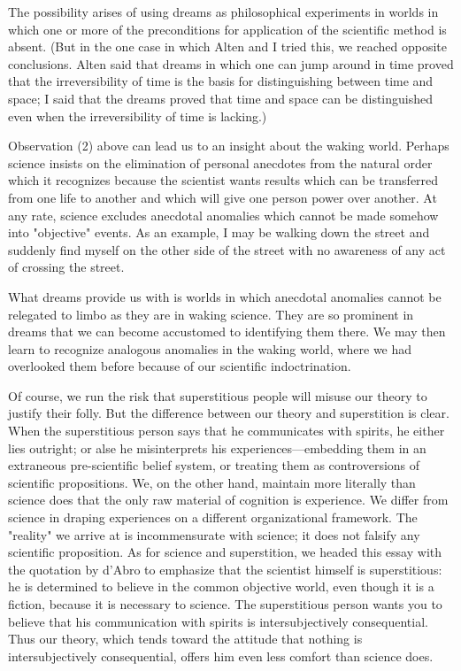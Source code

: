 \documentclass[10pt,twoside,draft]{memoir}
\begin{document}
{{The possibility arises of using dreams as philosophical experiments in 
worlds in which one or more of the preconditions for application of the 
scientific method is absent. (But in the one case in which Alten and I tried 
this, we reached opposite conclusions. Alten said that dreams in which one 
can jump around in time proved that the irreversibility of time is the basis 
for distinguishing between time and space; I said that the dreams proved that 
time and space can be distinguished even when the irreversibility of time is 
lacking.) 

Observation (2) above can lead us to an insight about the waking world. 
Perhaps science insists on the elimination of personal anecdotes from the 
natural order which it recognizes because the scientist wants results which 
can be transferred from one life to another and which will give one person 
power over another. At any rate, science excludes anecdotal anomalies which 
cannot be made somehow into "objective" events. As an example, I may be 
walking down the street and suddenly find myself on the other side of the 
street with no awareness of any act of crossing the street. 

What dreams provide us with is worlds in which anecdotal anomalies 
cannot be relegated to limbo as they are in waking science. They are so 
prominent in dreams that we can become accustomed to identifying them 
there. We may then learn to recognize analogous anomalies in the waking 
world, where we had overlooked them before because of our scientific 
indoctrination. 

Of course, we run the risk that superstitious people will misuse our 
theory to justify their folly. But the difference between our theory and 
superstition is clear. When the superstitious person says that he 
communicates with spirits, he either lies outright; or alse he misinterprets his 
experiences---embedding them in an extraneous pre-scientific belief system, 
or treating them as controversions of scientific propositions. We, on the 
other hand, maintain more literally than science does that the only raw 
material of cognition is experience. We differ from science in draping 
experiences on a different organizational framework. The "reality" we arrive 
at is incommensurate with science; it does not falsify any scientific 
proposition. As for science and superstition, we headed this essay with the 
quotation by d'Abro to emphasize that the scientist himself is superstitious: 
he is determined to believe in the common objective world, even though it is 
a fiction, because it is necessary to science. The superstitious person wants 
you to believe that his communication with spirits is intersubjectively 
consequential. Thus our theory, which tends toward the attitude that 
nothing is intersubjectively consequential, offers him even less comfort than 
science does. 

}}
\end{document}
